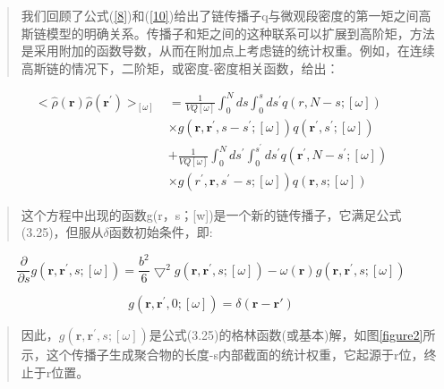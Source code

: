 \begin{quotation}
	我们回顾了公式(\ref{8})和(\ref{10})给出了链传播子q与微观段密度的第一矩之间高斯链模型的明确关系。传播子和矩之间的这种联系可以扩展到高阶矩，方法是采用附加的函数导数，从而在附加点上考虑链的统计权重。例如，在连续高斯链的情况下，二阶矩，或密度-密度相关函数，给出：
\end{quotation}
\begin{align}\label{28}
<\hat{\rho}(\mathbf{r})\hat{\rho}(\mathbf{r}^{'})>_{[\omega]}&=\frac{1}{VQ[\omega]}\int_{0}^{N}ds \int_{0}^{s}ds^{'}q(r,N-s;[\omega])\\&\times g(\mathbf{r},\mathbf{r}^{'},s-s^{'};[\omega])q(\mathbf{r}^{'},s^{'};[\omega])\\&+\frac{1}{VQ[\omega]}\int_{0}^{N}ds^{'} \int_{0}^{s^{'}}ds^{'}q(\mathbf{r}^{'},N-s^{'};[\omega])\\&\times g(r^{'},\mathbf{r},s^{'}-s;[\omega])q(\mathbf{r},s;[\omega])
\end{align}
\begin{quotation}
	这个方程中出现的函数g(r，s；[w])是一个新的链传播子，它满足公式(3.25)，但服从$\delta$函数初始条件，即:
\end{quotation}
\begin{equation}\label{29}
\frac{\partial}{\partial s}g(\mathbf{r},\mathbf{r}^{'},s;[\omega])=\frac{b^2}{6}\bigtriangledown^2g(\mathbf{r},\mathbf{r}^{'},s;[\omega])-\omega(\mathbf{r})g(\mathbf{r},\mathbf{r}^{'},s;[\omega])
\end{equation}

\begin{equation}\label{30}
g(\mathbf{r},\mathbf{r}^{'},0;[\omega])=\delta(\mathbf{r}-\mathbf{r}{'})
\end{equation}
\begin{quotation}
	因此，$g(\mathbf{r},\mathbf{r}^{'},s;[\omega])$是公式(3.25)的格林函数(或基本)解，如图\ref{figure2}所示，这个传播子生成聚合物的长度-s内部截面的统计权重，它起源于r位，终止于r位置。
\end{quotation}


